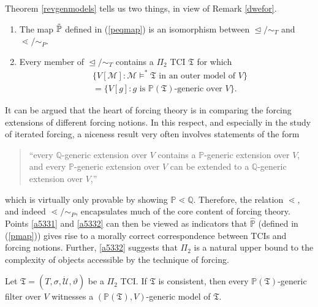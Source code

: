 \documentclass[12pt]{article}
\numberwithin{equation}{section}
\begin{document}
\begin{rem}\label{ramble1}
Theorem \ref{revgenmodels} tells us two things, in view of Remark \ref{dwefor}.
\begin{enumerate}[label=(\arabic*)]
    \item\label{a5331} The map $\Tilde{\mathbb{P}}$ defined in (\ref{peqmap}) is an isomorphism between $\trianglelefteq / \sim_T$ and $\lessdot / \sim_P$.
    \item\label{a5332} Every member of $\trianglelefteq / \sim_T$ contains a $\Pi_2$ TCI $\mathfrak{T}$ for which
    \begin{align*}
        & \{V[\mathcal{M}] : \mathcal{M} \models^* \mathfrak{T} \text{ in an outer model of } V\} \\
        & = \{V[g] : g \text{ is } \mathbb{P}(\mathfrak{T}) \text{-generic over } V\} \text{.}
    \end{align*}
\end{enumerate}
It can be argued that the heart of forcing theory is in comparing the forcing extensions of different forcing notions. In this respect, and especially in the study of iterated forcing, a niceness result very often involves statements of the form 
\begin{quote}
    ``every $\mathbb{Q}$-generic extension over $V$ contains a $\mathbb{P}$-generic extension over $V$, and every $\mathbb{P}$-generic extension over $V$ can be extended to a $\mathbb{Q}$-generic extension over $V$,''
\end{quote}
which is virtually only provable by showing $\mathbb{P} \lessdot \mathbb{Q}$. Therefore, the relation $\lessdot$, and indeed $\lessdot / \sim_P$, encapsulates much of the core content of forcing theory. Points \ref{a5331} and \ref{a5332} can then be viewed as indicators that $\hat{\mathbb{P}}$ (defined in (\ref{pmap})) gives rise to a morally correct correspondence between TCIs and forcing notions. Further, \ref{a5332} suggests that $\Pi_2$ is a natural upper bound to the complexity of objects accessible by the technique of forcing.
\end{rem}

\begin{thm}\label{genericmodels}
Let $\mathfrak{T} = (T, \sigma, \dot{\mathcal{U}}, \vartheta)$ be a $\Pi_2$ TCI. If $\mathfrak{T}$ is consistent, then every $\mathbb{P}(\mathfrak{T})$-generic filter over $V$ witnesses a $(\mathbb{P}(\mathfrak{T}), V)$-generic model of $\mathfrak{T}$.
\end{thm}
\end{document}
